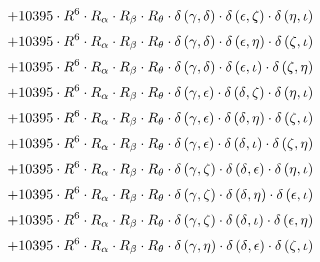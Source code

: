\begin{subequations}
\begin{gather}
 \\[0.2em] \notag 		 + 10395 \cdot R^{6} \cdot R_{\alpha{}} \cdot R_{\beta{}} \cdot R_{\theta{}} \cdot \delta{}\left(\gamma{}, \delta{}\right) \cdot \delta{}\left(\epsilon{}, \zeta{}\right) \cdot \delta{}\left(\eta{}, \iota{}\right) 
 \\[0.2em] \notag 		 + 10395 \cdot R^{6} \cdot R_{\alpha{}} \cdot R_{\beta{}} \cdot R_{\theta{}} \cdot \delta{}\left(\gamma{}, \delta{}\right) \cdot \delta{}\left(\epsilon{}, \eta{}\right) \cdot \delta{}\left(\zeta{}, \iota{}\right) 
 \\[0.2em] \notag 		 + 10395 \cdot R^{6} \cdot R_{\alpha{}} \cdot R_{\beta{}} \cdot R_{\theta{}} \cdot \delta{}\left(\gamma{}, \delta{}\right) \cdot \delta{}\left(\epsilon{}, \iota{}\right) \cdot \delta{}\left(\zeta{}, \eta{}\right) 
 \\[0.2em] \notag 		 + 10395 \cdot R^{6} \cdot R_{\alpha{}} \cdot R_{\beta{}} \cdot R_{\theta{}} \cdot \delta{}\left(\gamma{}, \epsilon{}\right) \cdot \delta{}\left(\delta{}, \zeta{}\right) \cdot \delta{}\left(\eta{}, \iota{}\right) 
 \\[0.2em] \notag 		 + 10395 \cdot R^{6} \cdot R_{\alpha{}} \cdot R_{\beta{}} \cdot R_{\theta{}} \cdot \delta{}\left(\gamma{}, \epsilon{}\right) \cdot \delta{}\left(\delta{}, \eta{}\right) \cdot \delta{}\left(\zeta{}, \iota{}\right) 
 \\[0.2em] \notag 		 + 10395 \cdot R^{6} \cdot R_{\alpha{}} \cdot R_{\beta{}} \cdot R_{\theta{}} \cdot \delta{}\left(\gamma{}, \epsilon{}\right) \cdot \delta{}\left(\delta{}, \iota{}\right) \cdot \delta{}\left(\zeta{}, \eta{}\right) 
 \\[0.2em] \notag 		 + 10395 \cdot R^{6} \cdot R_{\alpha{}} \cdot R_{\beta{}} \cdot R_{\theta{}} \cdot \delta{}\left(\gamma{}, \zeta{}\right) \cdot \delta{}\left(\delta{}, \epsilon{}\right) \cdot \delta{}\left(\eta{}, \iota{}\right) 
 \\[0.2em] \notag 		 + 10395 \cdot R^{6} \cdot R_{\alpha{}} \cdot R_{\beta{}} \cdot R_{\theta{}} \cdot \delta{}\left(\gamma{}, \zeta{}\right) \cdot \delta{}\left(\delta{}, \eta{}\right) \cdot \delta{}\left(\epsilon{}, \iota{}\right) 
 \\[0.2em] \notag 		 + 10395 \cdot R^{6} \cdot R_{\alpha{}} \cdot R_{\beta{}} \cdot R_{\theta{}} \cdot \delta{}\left(\gamma{}, \zeta{}\right) \cdot \delta{}\left(\delta{}, \iota{}\right) \cdot \delta{}\left(\epsilon{}, \eta{}\right) 
 \\[0.2em] \notag 		 + 10395 \cdot R^{6} \cdot R_{\alpha{}} \cdot R_{\beta{}} \cdot R_{\theta{}} \cdot \delta{}\left(\gamma{}, \eta{}\right) \cdot \delta{}\left(\delta{}, \epsilon{}\right) \cdot \delta{}\left(\zeta{}, \iota{}\right) 

\end{gather}
\end{subequations}
